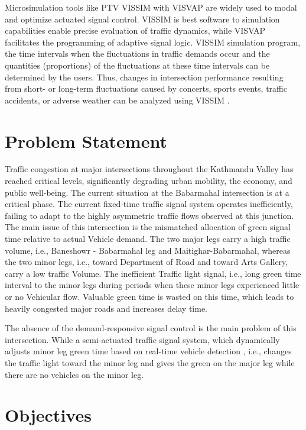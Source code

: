 Microsimulation tools like PTV VISSIM with VISVAP are widely used to modal 
and optimize actuated signal control. VISSIM is best software to simulation
capabilities enable precise evaluation of traffic dynamics, while VISVAP
facilitates the programming of adaptive signal logic.  VISSIM simulation 
program, the time intervals when the fluctuations in traffic demands occur 
and the quantities (proportions) of the fluctuations at these time intervals
can be determined by the users. Thus, changes in intersection performance
resulting from short- or long-term fluctuations caused by concerts, sports
events, traffic accidents, or adverse weather can be analyzed using VISSIM \cite{cakici2021} .

\section{Problem Statement}
Traffic congestion at major intersections throughout the Kathmandu Valley 
has reached critical levels, significantly degrading urban mobility, the
economy, and public well-being. The current situation at the Babarmahal 
intersection is at a critical phase. The current fixed-time traffic signal 
system operates inefficiently, failing to adapt to the highly asymmetric 
traffic flows observed at this junction. The main issue of this intersection
is the mismatched allocation of green signal time relative to actual Vehicle 
demand.  The two major legs carry a high traffic volume, i.e., Baneshowr
- Babarmahal leg and Maitighar-Babarmahal, whereas the two minor legs, 
i.e., toward Department of Road and toward Arts Gallery, carry a low 
traffic Volume. The inefficient Traffic light signal, i.e., long green 
time interval to the minor legs during periods when these minor legs 
experienced little or no Vehicular flow. Valuable green time is wasted 
on this time, which leads to heavily congested major roads and increases 
delay time.

The absence of the demand-responsive signal control is the main problem 
of this intersection. While a semi-actuated traffic signal system, which 
dynamically adjusts minor leg green time based on real-time vehicle detection
, i.e., changes the traffic light toward the minor leg and gives the green on
the major leg while there are no vehicles on the minor leg.

\section{Objectives}


